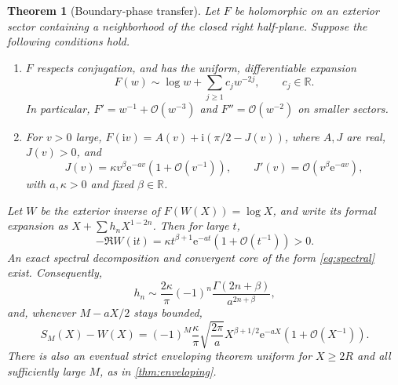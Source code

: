 \documentclass[11pt,a4paper]{article}
\newtheorem{theorem}{Theorem}[section]
\theoremstyle{definition}
\numberwithin{equation}{section}
\newcommand{\ii}{\mathrm{i}}
\newcommand{\ee}{\mathrm{e}}
\newcommand{\R}{\mathbb R}
\newcommand{\Oh}{\mathcal O}
\begin{document}
\begin{theorem}[Boundary-phase transfer]
\label{thm:transfer}
Let $F$ be holomorphic on an exterior sector containing a neighborhood of the closed right half-plane. Suppose the following conditions hold.
\begin{enumerate}[label=\textup{(\roman*)},leftmargin=2em,itemsep=3pt]
\item $F$ respects conjugation, and has the uniform, differentiable expansion
\[
 F(w)\sim\log w+\sum_{j\ge1}c_jw^{-2j},\qquad c_j\in\R.
\]
In particular, $F'=w^{-1}+\Oh(w^{-3})$ and $F''=\Oh(w^{-2})$ on smaller sectors.
\item For $v>0$ large, $F(\ii v)=A(v)+\ii(\pi/2-J(v))$, where $A,J$ are real, $J(v)>0$, and
\begin{equation}
 J(v)=\kappa v^\beta\ee^{-av}(1+\Oh(v^{-1})),\qquad
 J'(v)=\Oh(v^\beta\ee^{-av}),
 \label{eq:general-defect}
\end{equation}
with $a,\kappa>0$ and fixed $\beta\in\R$.
\end{enumerate}
Let $W$ be the exterior inverse of $F(W(X))=\log X$, and write its formal expansion as $X+\sum h_nX^{1-2n}$. Then for large $t$,
\begin{equation}
 -\Re W(\ii t)=\kappa t^{\beta+1}\ee^{-at}(1+\Oh(t^{-1}))>0.
 \label{eq:general-density}
\end{equation}
An exact spectral decomposition and convergent core of the form \eqref{eq:spectral} exist. Consequently,
\begin{equation}
 h_n\sim\frac{2\kappa}{\pi}(-1)^n
                \frac{\Gamma(2n+\beta)}{a^{2n+\beta}},
 \label{eq:general-late}
\end{equation}
and, whenever $M-aX/2$ stays bounded,
\begin{equation}
 S_M(X)-W(X)
 =(-1)^M\frac{\kappa}{\pi}\sqrt{\frac{2\pi}{a}}
           X^{\beta+1/2}\ee^{-aX}(1+\Oh(X^{-1})).
 \label{eq:general-optimal}
\end{equation}
There is also an eventual strict enveloping theorem uniform for $X\ge2R$ and all sufficiently large $M$, as in \cref{thm:enveloping}.
\end{theorem}
\end{document}
